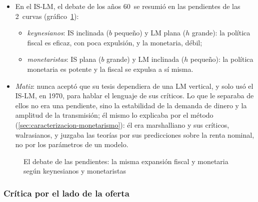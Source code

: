 \documentclass[11pt]{article}
\begin{document}
\begin{itemize}
\item En el IS-LM, el debate de los años 60~se resumió en las pendientes de las 2~curvas (gráfico~\ref{fig:pendientes}):
  \begin{itemize}
  \item \emph{keynesianos}: IS inclinada ($b$ pequeño) y LM plana ($h$ grande): la política fiscal es eficaz, con poca expulsión, y la monetaria, débil;
  \item \emph{monetaristas}: IS plana ($b$ grande) y LM inclinada ($h$ pequeño): la política monetaria es potente y la fiscal se expulsa a sí misma.
  \end{itemize}
\item \emph{Matiz}:  nunca aceptó que su tesis dependiera de una LM vertical, y solo usó el IS-LM, en 1970, para hablar el lenguaje de sus críticos. Lo que le separaba de ellos no era una pendiente, sino la estabilidad de la demanda de dinero y la amplitud de la transmisión; él mismo lo explicaba por el método (\ref{sec:caracterizacion-monetarismo}): él era marshalliano y sus críticos, walrasianos, y juzgaba las teorías por sus predicciones sobre la renta nominal, no por los parámetros de un modelo\nocite{BordoSchwartz2003ISLM}.
\end{itemize}

\begin{figure}[H]
\centering
\caption{El debate de las pendientes: la misma expansión fiscal y monetaria según keynesianos y monetaristas}\label{fig:pendientes}
\end{figure}

\subsubsection{Crítica por el lado de la oferta}\label{sec:oferta}
\end{document}
